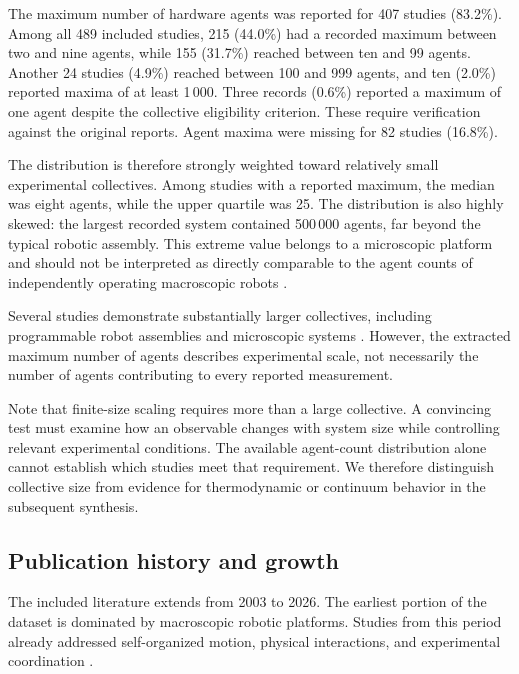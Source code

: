 The maximum number of hardware agents was reported for 407 studies (83.2\%). Among all 489 included studies, 215 (44.0\%) had a recorded maximum between two and nine agents, while 155 (31.7\%) reached between ten and 99 agents. Another 24 studies (4.9\%) reached between 100 and 999 agents, and ten (2.0\%) reported maxima of at least 1\,000. Three records (0.6\%) reported a maximum of one agent despite the collective eligibility criterion. These require verification against the original reports. Agent maxima were missing for 82 studies (16.8\%).

The distribution is therefore strongly weighted toward relatively small experimental collectives. Among studies with a reported maximum, the median was eight agents, while the upper quartile was 25. The distribution is also highly skewed: the largest recorded system contained 500\,000 agents, far beyond the typical robotic assembly. This extreme value belongs to a microscopic platform and should not be interpreted as directly comparable to the agent counts of independently operating macroscopic robots \cite{Xie2020bioinspiredsoftmic}.

Several studies demonstrate substantially larger collectives, including programmable robot assemblies and microscopic systems \cite{Rubenstein2014programmableselfas,Ferrante2012explicitandimplici,Gauci2017errorcascadesinco,Yang2019statisticsbasedaut,Baconnier2022selectiveandcollec,Fu2023entropybyneighbor,Wang2025hyperuniformnetwork,Zhang2026emergentnonhermiti,Ceron2026fluidictorqueenabl}. However, the extracted maximum number of agents describes experimental scale, not necessarily the number of agents contributing to every reported measurement.

Note that finite-size scaling requires more than a large collective. A convincing test must examine how an observable changes with system size while controlling relevant experimental conditions. The available agent-count distribution alone cannot establish which studies meet that requirement. We therefore distinguish collective size from evidence for thermodynamic or continuum behavior in the subsequent synthesis.

\subsection{Publication history and growth}
\label{sec:results-growth}

The included literature extends from 2003 to 2026. The earliest portion of the dataset is dominated by macroscopic robotic platforms. Studies from this period already addressed self-organized motion, physical interactions, and experimental coordination \cite{Hayes2003selforganizedflock,Mizuguchi2004collectivedynamics,Spears2004distributedphysics,Kelly2004ascalableonboard,Belta2004controlofateamof,ICHIKAWA2004smallintelligentro,Turgut2008modelingphasetrans,Navarro2008anapproachtoflock,Christensen2008swarmorphscripta,Turgut2008selforganizedflocka,Hamann2008spatialmacroscopic}.

